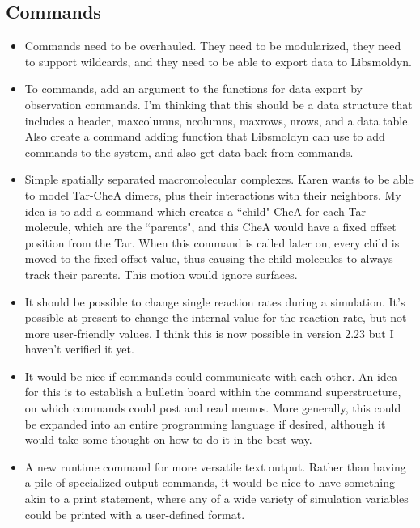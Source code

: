 \documentclass {scrbook}
\begin{document}
\subsection{Commands}
\begin{itemize}
\item Commands need to be overhauled. They need to be modularized, they need to support wildcards, and they need to be able to export data to Libsmoldyn.
\item To commands, add an argument to the functions for data export by observation commands. I'm thinking that this should be a data structure that includes a header, maxcolumns, ncolumns, maxrows, nrows, and a data table. Also create a command adding function that Libsmoldyn can use to add commands to the system, and also get data back from commands.
\item Simple spatially separated macromolecular complexes. Karen wants to be able to model Tar-CheA dimers, plus their interactions with their neighbors. My idea is to add a command which creates a ``child" CheA for each Tar molecule, which are the ``parents", and this CheA would have a fixed offset position from the Tar. When this command is called later on, every child is moved to the fixed offset value, thus causing the child molecules to always track their parents. This motion would ignore surfaces.
\item It should be possible to change single reaction rates during a simulation. It's possible at present to change the internal value for the reaction rate, but not more user-friendly values. I think this is now possible in version 2.23 but I haven't verified it yet.
\item It would be nice if commands could communicate with each other. An idea for this is to establish a bulletin board within the command superstructure, on which commands could post and read memos. More generally, this could be expanded into an entire programming language if desired, although it would take some thought on how to do it in the best way.
\item A new runtime command for more versatile text output. Rather than having a pile of specialized output commands, it would be nice to have something akin to a print statement, where any of a wide variety of simulation variables could be printed with a user-defined format.
\end{itemize}
\end{document}
